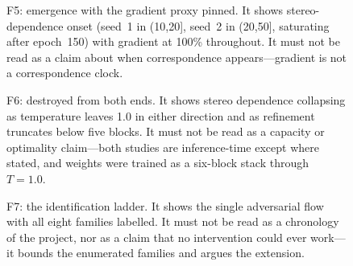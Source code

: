 \documentclass[conference]{IEEEtran}
\begin{document}
\begin{figure}[t]
\centering
{}
\caption{F5: emergence with the gradient proxy pinned. It shows stereo-dependence onset (seed~1 in (10,20], seed~2 in (20,50], saturating after epoch~150) with gradient at 100\% throughout. It must not be read as a claim about when correspondence appears---gradient is not a correspondence clock.}
\label{fig:f5}
\end{figure}

\begin{figure}[t]
\centering
{}
\caption{F6: destroyed from both ends. It shows stereo dependence collapsing as temperature leaves 1.0 in either direction and as refinement truncates below five blocks. It must not be read as a capacity or optimality claim---both studies are inference-time except where stated, and weights were trained as a six-block stack through $T=1.0$.}
\label{fig:f6}
\end{figure}

\begin{figure}[t]
\centering
{}
\caption{F7: the identification ladder. It shows the single adversarial flow with all eight families labelled. It must not be read as a chronology of the project, nor as a claim that no intervention could ever work---it bounds the enumerated families and argues the extension.}
\label{fig:f7}
\end{figure}
\end{document}
